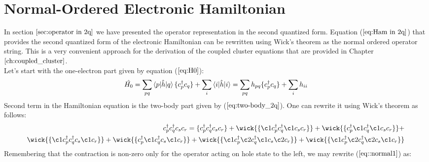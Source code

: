 \documentclass[twoside,english]{uiofysmaster}
\theoremstyle{definition}
\begin{document}
\section{Normal-Ordered Electronic Hamiltonian}
In section $\ref{sec:operator in 2q}$ we have presented the operator representation in the second quantized form. Equation ($\ref{eq:Ham in 2q}$) that provides the second quantized form of the electronic Hamiltonian can be rewritten using Wick's theorem as the normal ordered operator string. This is a very convenient approach for the derivation of the coupled cluster equations that are provided in Chapter $\ref{ch:coupled_cluster}$.  \\
Let's start with the one-electron part given by equation ($\ref{eq:H0}$):
\begin{equation}
\hat{H_0}=\sum_{pq} \braket{p|\hat{h}|q} \{c_p^\dagger c_q \} + \sum_{i}\braket{i|\hat{h}|i} =\sum_{pq} h_{pq} \{c_p^\dagger c_q \} + \sum_{i}h_{ii}
\end{equation}
Second term in the Hamiltonian equation is the two-body part given by ($\ref{eq:two-body_2q}$). One can rewrite it using Wick's theorem as follows:
\begin{eqnarray}\label{eq::normal1}
c_p^\dagger c_q^\dagger c_s c_r= \{ c_p^\dagger c_q^\dagger c_s c_r  \} + \wick{\{ \c1 c_p^\dagger c_q^\dagger \c1 c_s c_r \}} + \wick{\{  c_p^\dagger \c1 c_q^\dagger \c1 c_s c_r \}} +\nonumber\\  \wick{\{  \c1 c_p^\dagger  c_q^\dagger  c_s \c1 c_r \}} 
+ \wick{\{  c_p^\dagger \c1 c_q^\dagger  c_s \c1 c_r \}} +\wick{\{\c1  c_p^\dagger \c2 c_q^\dagger \c1 c_s \c2 c_r \}} +\wick{\{\c1  c_p^\dagger \c2 c_q^\dagger \c2 c_s \c1 c_r \}}  
\end{eqnarray}
Remembering that the contraction is non-zero only for the operator acting on hole state to the left, we may rewrite ($\ref{eq::normal1} $) as:
\end{document}
